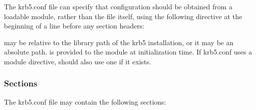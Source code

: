 \documentclass[letterpaper,10pt,english]{sphinxmanual}
\begin{document}
\sphinxAtStartPar
The krb5.conf file can specify that configuration should be obtained
from a loadable module, rather than the file itself, using the
following directive at the beginning of a line before any section
headers:

\begin{sphinxVerbatim}[commandchars=\\\{\}]
 
\end{sphinxVerbatim}

\sphinxAtStartPar
{} may be relative to the library path of the krb5
installation, or it may be an absolute path.   is provided
to the module at initialization time.  If krb5.conf uses a module
directive, {\hyperref[\detokenize{admin/conf_files/kdc_conf:kdc-conf-5}]{}} should also use one if it exists.


\subsubsection{Sections}
\label{\detokenize{admin/conf_files/krb5_conf:sections}}
\sphinxAtStartPar
The krb5.conf file may contain the following sections:
\end{document}
